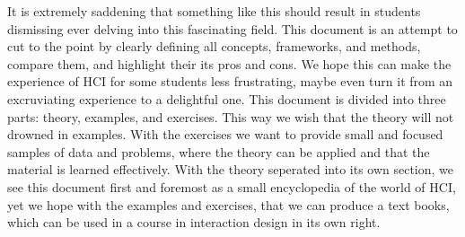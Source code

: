 It is extremely saddening that something like this should result in students dismissing ever delving into this fascinating field. This document is an attempt to cut to the point by clearly defining all concepts, frameworks, and methods, compare them, and highlight their its pros and cons. We hope this can make the experience of HCI for some students less frustrating, maybe even turn it from an excruviating experience to a delightful one. This document is divided into three parts: theory, examples, and exercises. This way we wish that the theory will not drowned in examples. With the exercises we want to provide small and focused samples of data and problems, where the theory can be applied and that the material is learned effectively. With the theory seperated into its own section, we see this document first and foremost as a small encyclopedia of the world of HCI, yet we hope with the examples and exercises, that we can produce a text books, which can be used in a course in interaction design in its own right.


